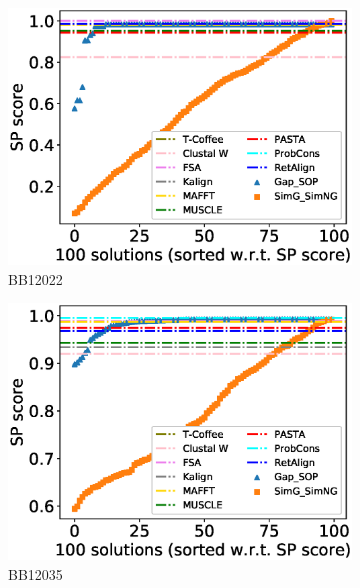 \begin{figure}[!htbp]
\begin{adjustwidth}{-1.5cm}{-1cm}
		\begin{subfigure}{0.22\textwidth}
			\includegraphics[width=\columnwidth]{Figure/summary/precomputedInit/Balibase/BB12022_pairs_density_single_run_2}
			\caption{BB12022}
		\end{subfigure}
		\begin{subfigure}{0.22\textwidth}
			\includegraphics[width=\columnwidth]{Figure/summary/precomputedInit/Balibase/BB12035_pairs_density_single_run_2}
			\caption{BB12035}
		\end{subfigure}
		\begin{subfigure}{0.22\textwidth}

\end{subfigure}
\end{adjustwidth}
\end{figure}
